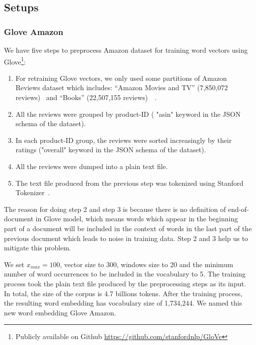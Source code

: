\subsection{Setups}
\subsubsection{Glove Amazon}\label{sec:glove-amazon}
We have five steps to preprocess Amazon dataset for training word vectors using Glove\footnote{Publicly available on Github \url{https://github.com/stanfordnlp/GloVe}}:
\begin{enumerate}
	\item For retraining Glove vectors, we only used some partitions of Amazon Reviews dataset which includes:  ``Amazon Movies and TV'' (7,850,072 reviews)~\cite{mcauley2013hidden} and ``Books'' (22,507,155 reviews)~\cite{McAuleyTSH15}~\cite{HeM16}.
	\item All the reviews were grouped by product-ID ( "asin" keyword in the JSON schema of the dataset).
	\item In each product-ID group, the reviews were sorted increasingly by their ratings ("overall" keyword in the JSON schema of the dataset).
	\item All the reviews were dumped into a plain text file.
	\item The text file produced from the previous step was tokenized using Stanford Tokenizer~\cite{tokenizerpart}.
\end{enumerate}

The reason for doing step 2 and step 3 is because there is no definition of end-of-document in Glove model, which means words which appear in the beginning part of a document will be included in the context of words in the last part of the previous document which leads to noise in training data. Step 2 and 3 help us to mitigate this problem.

We set $x_{max} = 100$, vector size to 300, windows size to 20 and the minimum number of word occurrences to be included in the vocabulary to 5.
The training process took the plain text file produced by the preprocessing steps as its input.
In total, the size of the corpus is 4.7 billions tokens.
After the training process, the resulting word embedding has vocabulary size of 1,734,244.
We named this new word embedding Glove Amazon.
